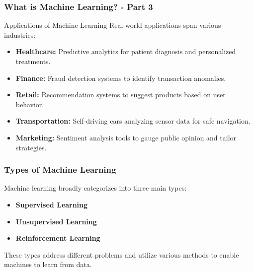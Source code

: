 \documentclass[aspectratio=169]{beamer}
\begin{document}
\begin{frame}[fragile]
    \frametitle{What is Machine Learning? - Part 3}
    \begin{block}{Applications of Machine Learning}
        Real-world applications span various industries:
    \end{block}
    \begin{itemize}
        \item \textbf{Healthcare:} Predictive analytics for patient diagnosis and personalized treatments.
        \item \textbf{Finance:} Fraud detection systems to identify transaction anomalies.
        \item \textbf{Retail:} Recommendation systems to suggest products based on user behavior.
        \item \textbf{Transportation:} Self-driving cars analyzing sensor data for safe navigation.
        \item \textbf{Marketing:} Sentiment analysis tools to gauge public opinion and tailor strategies.
    \end{itemize}
\end{frame}

\begin{frame}[fragile]
    \frametitle{Types of Machine Learning}
    Machine learning broadly categorizes into three main types:
    \begin{itemize}
        \item \textbf{Supervised Learning}
        \item \textbf{Unsupervised Learning}
        \item \textbf{Reinforcement Learning}
    \end{itemize}
    These types address different problems and utilize various methods to enable machines to learn from data.
\end{frame}
\end{document}
